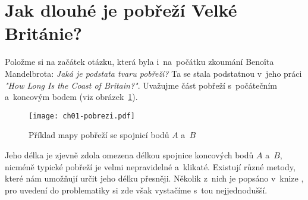 \section{Jak dlouhé je pobřeží Velké Británie?}\label{sec:pobrezi_velke_britanie}
Položme si na začátek otázku, která byla i~na~počátku zkoumání Benoîta Mandelbrota: \emph{Jaká je podstata tvaru pobřeží?} Ta se stala podstatnou v~jeho práci \emph{"How Long Is the Coast of Britain?"}. Uvažujme část pobřeží s~počátečním a~koncovým bodem (viz obrázek~\ref{fig:pobrezi}).
\begin{figure}[h]
    \centering
    \texttt{[image: ch01-pobrezi.pdf]}
    \caption{Příklad mapy pobřeží se spojnicí bodů $A$ a~$B$}
    \label{fig:pobrezi}
\end{figure}
Jeho délka je zjevně zdola omezena délkou spojnice koncových bodů $A$ a~$B$, nicméně typické pobřeží je velmi nepravidelné a~klikaté. Existují různé metody, které nám umožňují určit jeho délku přesněji. Několik z~nich je popsáno v~knize \citep[str. 79]{Mandelbrot1983}, pro uvedení do problematiky si zde však vystačíme s~tou nejjednodušší.

